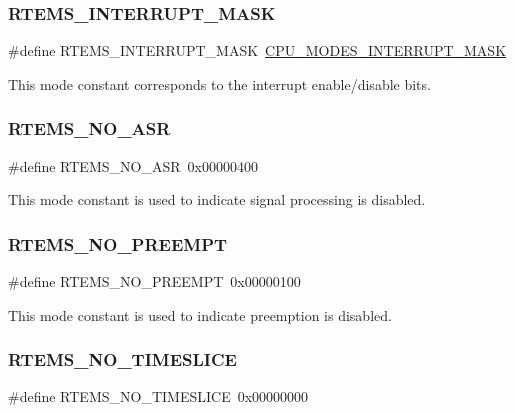 \subsubsection{\texorpdfstring{RTEMS\_INTERRUPT\_MASK}{RTEMS\_INTERRUPT\_MASK}}
{\footnotesize\ttfamily \#define R\+T\+E\+M\+S\+\_\+\+I\+N\+T\+E\+R\+R\+U\+P\+T\+\_\+\+M\+A\+SK~\mbox{\hyperlink{sparc_2include_2rtems_2score_2cpu_8h_af8823e651e33b9683e0d89e5a8054ee6}{C\+P\+U\+\_\+\+M\+O\+D\+E\+S\+\_\+\+I\+N\+T\+E\+R\+R\+U\+P\+T\+\_\+\+M\+A\+SK}}}

This mode constant corresponds to the interrupt enable/disable bits. \mbox{\label{group__ClassicModes_gad67a5c6d7c644641c29a800b327549bb}} 
\subsubsection{\texorpdfstring{RTEMS\_NO\_ASR}{RTEMS\_NO\_ASR}}
{\footnotesize\ttfamily \#define R\+T\+E\+M\+S\+\_\+\+N\+O\+\_\+\+A\+SR~0x00000400}

This mode constant is used to indicate signal processing is disabled. \mbox{\label{group__ClassicModes_gaabb8ccb34ba1b5c0497f370781630c88}} 
\subsubsection{\texorpdfstring{RTEMS\_NO\_PREEMPT}{RTEMS\_NO\_PREEMPT}}
{\footnotesize\ttfamily \#define R\+T\+E\+M\+S\+\_\+\+N\+O\+\_\+\+P\+R\+E\+E\+M\+PT~0x00000100}

This mode constant is used to indicate preemption is disabled. \mbox{\label{group__ClassicModes_ga140fecfdfeab8c819c7c7c20bd79f8ed}} 
\subsubsection{\texorpdfstring{RTEMS\_NO\_TIMESLICE}{RTEMS\_NO\_TIMESLICE}}
{\footnotesize\ttfamily \#define R\+T\+E\+M\+S\+\_\+\+N\+O\+\_\+\+T\+I\+M\+E\+S\+L\+I\+CE~0x00000000}

